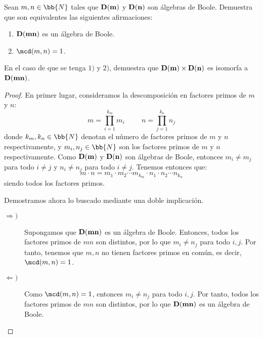 \begin{ejercicio}
    Sean $m,n\in \bb{N}$ tales que $\bf{D}(m)$ y $\bf{D}(n)$ son álgebras de Boole. Demuestra que son equivalentes las siguientes afirmaciones:
    \begin{enumerate}
        \item $\bf{D}(mn)$ es un álgebra de Boole.
        \item $\mcd(m,n)=1$.
    \end{enumerate}
    En el caso de que se tenga $1)$ y $2)$, demuestra que $\bf{D}(m)\times \bf{D}(n)$ es isomorfa a $\bf{D}(mn)$.
    \begin{proof}
        En primer lugar, consideramos la descomposición en factores primos de $m$ y $n$:
        \begin{equation*}
            m = \prod_{i=1}^{k_m} m_i \hspace{1cm} n = \prod_{j=1}^{k_n} n_j
        \end{equation*}
        donde $k_m,k_n\in \bb{N}$ denotan el número de factores primos de $m$ y $n$ respectivamente,
        y $m_i,n_j\in \bb{N}$ son los factores primos de $m$ y $n$ respectivamente. Como $\bf{D}(m)$ y $\bf{D}(n)$
        son álgebras de Boole, entonces $m_i\neq m_j$ para todo $i\neq j$ y $n_i\neq n_j$ para todo $i\neq j$.
        Tenemos entonces que:
        \begin{equation*}
            m \cdot n = m_1\cdot m_2\cdots m_{k_m}\cdot n_1\cdot n_2\cdots n_{k_n}
        \end{equation*}
        siendo todos los factores primos.

        Demostramos ahora lo buscado mediante una doble implicación.
        \begin{description}
            \item[$\Longrightarrow)$]
            
            Supongamos que $\bf{D}(mn)$ es un álgebra de Boole. Entonces, todos los factores primos de $mn$ son distintos, por lo que $m_i\neq n_j$ para todo $i,j$. Por tanto,
            tenemos que $m,n$ no tienen factores primos en común, es decir, $\mcd(m,n)=1$.
            
            
            
            \item[$\Longleftarrow)$]
            
            Como $\mcd(m,n)=1$, entonces $m_i\neq n_j$ para todo $i,j$. Por tanto, todos los factores primos de $mn$ son distintos, por lo que $\bf{D}(mn)$ es un álgebra de Boole.
        \end{description}
        

\end{proof}
\end{ejercicio}
